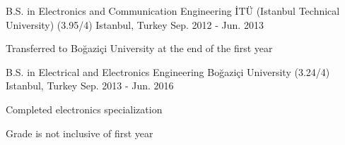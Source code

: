 

\begin{cventries}

  \cventry
    {B.S. in Electronics and Communication Engineering}
    {İTÜ (Istanbul Technical University) (3.95/4)}
    {Istanbul, Turkey}
    {Sep. 2012 - Jun. 2013}
    {
      \begin{cvitems}
        \item {Transferred to Boğaziçi University at the end of the first year}
      \end{cvitems}
    }
    
  \cventry
    {B.S. in Electrical and Electronics Engineering}
    {Boğaziçi University (3.24/4)}
    {Istanbul, Turkey}
    {Sep. 2013 - Jun. 2016}
    {
      \begin{cvitems}
        \item {Completed electronics specialization}
        \item {Grade is not inclusive of first year}
      \end{cvitems}
    }       

\end{cventries}
